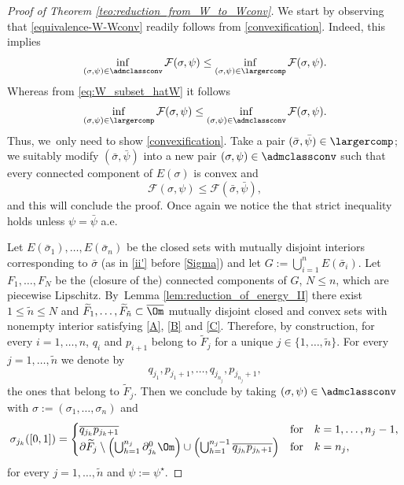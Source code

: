 \begin{proof}[Proof of Theorem \ref{teo:reduction_from_W_to_Wconv}]
We start by observing that \eqref{equivalence-W-Wconv} readily follows from \eqref{convexification}. Indeed, this implies
\begin{equation*}
\inf_{(\sigma,\psi)\in \admclassconv}
\mathcal{F}(\sigma,\psi)\le \inf_{(\sigma,\psi)
\in\largercomp} {\mathcal{F}}(\sigma,\psi)
.
\end{equation*}
Whereas from
\eqref{eq:W_subset_hatW}
it follows
\begin{equation*}
\inf_{(\sigma,\psi)\in\largercomp}
{\mathcal{F}}(\sigma,\psi)\le\inf_{(\sigma,\psi)\in\admclassconv }\mathcal{F}(\sigma,\psi).
\end{equation*}
Thus, we~only need to show \eqref{convexification}.
Take a pair $(\bar\sigma,\bar\psi)\in\largercomp$; we
suitably modify $(\bar\sigma,\bar\psi)$ into a new pair
$(\sigma,\psi)\in\admclassconv$ such that every connected component of $E(\sigma)$ is convex and
\begin{equation*}
\mathcal{F}(\sigma,\psi)\le{\mathcal F}(\bar\sigma,\bar\psi),
\end{equation*}
and this will conclude the proof. Once again we notice the that strict inequality holds unless $\psi=\bar\psi$ a.e.

Let $E(\bar\sigma_1),\dots,E(\bar\sigma_n)$ be the closed sets with mutually disjoint interiors corresponding to $\bar\sigma$ (as in \ref{ii'}
before \eqref{Sigma}) and let $G:=\bigcup_{i=1}^nE(\bar\sigma_i)$. Let
$F_1,\dots, F_N$ be the
(closure of the) connected components
of $G$, $N\leq n$, which are piecewise Lipschitz.
By~Lemma \ref{lem:reduction_of_energy_II} there exist $1\le \tilde n\le N$ and $\widetilde F_1,\dots,\widetilde F_{\tilde n}\subset\overline\Om$ mutually disjoint closed and convex sets with nonempty interior satisfying \eqref{A}, \eqref{B} and \eqref{C}.
Therefore, by construction, for every $i=1,\dots,n$,
$q_i$ and $p_{i+1}$ belong to $\widetilde F_j$ for a unique $j\in\{1,\dots,\tilde n\}$.
For every $j=1,\dots,\tilde n$ we denote by
\begin{equation*}
q_{j_1},p_{j_1+1},\dots, q_{j_{n_j}},p_{j_{n_j}+1},
\end{equation*}
the ones that belong to $\widetilde F_j$. Then we conclude by
taking $(\sigma,\psi)\in\admclassconv$ with $\sigma:=(\sigma_1,\dots,\sigma_n)$ and
\begin{equation*}
\sigma_{j_k}([0,1])=\begin{cases}
\overline{q_{j_k}p_{j_k+1}}&\text{for}\quad k=1,\dots,n_j-1,\\
\partial\widetilde F_j\setminus\Bigl(\bigcup_{h=1}^{n_j}\partial^0_{j_h}\Om\Bigr)\cup
\Bigl(\bigcup_{h=1}^{n_j-1}\overline{q_{j_h}p_{j_h+1}}\Bigr)&\text{for}\quad k=n_j,
\end{cases}
\end{equation*}
for every $j=1,\dots,\tilde n$ and $\psi:=\psi^\star$.
\end{proof}

